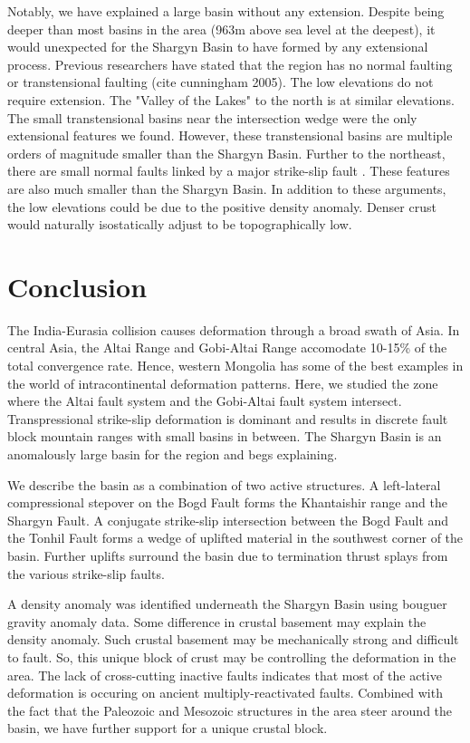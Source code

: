 \documentclass[10pt,a4paper]{article}
\begin{document}
	Notably, we have explained a large basin without any extension. Despite being deeper than most basins in the area (963m above sea level at the deepest), it would unexpected for the Shargyn Basin to have formed by any extensional process. Previous researchers have stated that the region has no normal faulting or transtensional faulting (cite cunningham 2005). The low elevations do not require extension. The "Valley of the Lakes" to the north is at similar elevations. The small transtensional basins near the intersection wedge were the only extensional features we found. However, these transtensional basins are multiple orders of magnitude smaller than the Shargyn Basin. Further to the northeast, there are small normal faults linked by a major strike-slip fault \citep{Walker2006}. These features are also much smaller than the Shargyn Basin. In addition to these arguments, the low elevations could be due to the positive density anomaly. Denser crust would naturally isostatically adjust to be topographically low.

\section{Conclusion}
	The India-Eurasia collision causes deformation through a broad swath of Asia. In central Asia, the Altai Range and Gobi-Altai Range accomodate 10-15\% of the total convergence rate. Hence, western Mongolia has some of the best examples in the world of intracontinental deformation patterns. Here, we studied the zone where the Altai fault system and the Gobi-Altai fault system intersect. Transpressional strike-slip deformation is dominant and results in discrete fault block mountain ranges with small basins in between. The Shargyn Basin is an anomalously large basin for the region and begs explaining. 

	We describe the basin as a combination of two active structures. A left-lateral compressional stepover on the Bogd Fault forms the Khantaishir range and the Shargyn Fault. A conjugate strike-slip intersection between the Bogd Fault and the Tonhil Fault forms a wedge of uplifted material in the southwest corner of the basin. Further uplifts surround the basin due to termination thrust splays from the various strike-slip faults. 

	A density anomaly was identified underneath the Shargyn Basin using bouguer gravity anomaly data. Some difference in crustal basement may explain the density anomaly. Such crustal basement may be mechanically strong and difficult to fault. So, this unique block of crust may be controlling the deformation in the area. The lack of cross-cutting inactive faults indicates that most of the active deformation is occuring on ancient multiply-reactivated faults. Combined with the fact that the Paleozoic and Mesozoic structures in the area steer around the basin, we have further support for a unique crustal block.




\end{document}
